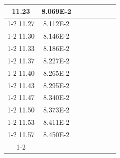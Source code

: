 \documentclass[article,12pt]{elsarticle}
\begin{document}
\begin{longtable}[c]{|c|c|cccccc}
11.23    & 8.069E-2  &                       &                              &                            &                       &                              &                               \\ \cline{1-2}
11.27    & 8.112E-2  &                       &                              &                            &                       &                              &                               \\ \cline{1-2}
11.30    & 8.146E-2  &                       &                              &                            &                       &                              &                               \\ \cline{1-2}
11.33    & 8.186E-2  &                       &                              &                            &                       &                              &                               \\ \cline{1-2}
11.37    & 8.227E-2  &                       &                              &                            &                       &                              &                               \\ \cline{1-2}
11.40    & 8.265E-2  &                       &                              &                            &                       &                              &                               \\ \cline{1-2}
11.43    & 8.295E-2  &                       &                              &                            &                       &                              &                               \\ \cline{1-2}
11.47    & 8.340E-2  &                       &                              &                            &                       &                              &                               \\ \cline{1-2}
11.50    & 8.373E-2  &                       &                              &                            &                       &                              &                               \\ \cline{1-2}
11.53    & 8.411E-2  &                       &                              &                            &                       &                              &                               \\ \cline{1-2}
11.57    & 8.450E-2  &                       &                              &                            &                       &                              &                               \\ \cline{1-2}

\end{longtable}
\end{document}
